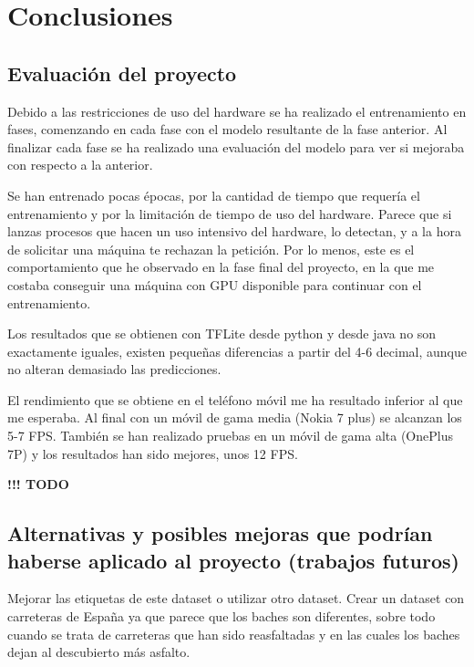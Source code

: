 \section{Conclusiones}
\label{sec:conclusiones}

\subsection{Evaluación del proyecto}


Debido a las restricciones de uso del hardware se ha realizado el entrenamiento en fases, comenzando en cada fase con el modelo resultante de la fase anterior. Al finalizar cada fase se ha realizado una evaluación del modelo para ver si mejoraba con respecto a la anterior.

Se han entrenado pocas épocas, por la cantidad de tiempo que requería el entrenamiento y por la limitación de tiempo de uso del hardware. Parece que si lanzas procesos que hacen un uso intensivo del hardware, lo detectan, y a la hora de solicitar una máquina te rechazan la petición. Por lo menos, este es el comportamiento que he observado en la fase final del proyecto, en la que me costaba conseguir una máquina con GPU disponible para continuar con el entrenamiento.

Los resultados que se obtienen con TFLite desde python y desde java no son exactamente iguales, existen pequeñas diferencias a partir del 4-6 decimal, aunque no alteran demasiado las predicciones.

El rendimiento que se obtiene en el teléfono móvil me ha resultado inferior al que me esperaba. Al final con un móvil de gama media (Nokia 7 plus) se alcanzan los 5-7 FPS. También se han realizado pruebas en un móvil de gama alta (OnePlus 7P) y los resultados han sido mejores, unos 12 FPS.

{\color{red} \textbf{!!! TODO}}

\subsection{Alternativas y posibles mejoras que podrían haberse aplicado al proyecto (trabajos futuros)}

Mejorar las etiquetas de este dataset o utilizar otro dataset. Crear un dataset con carreteras de España ya que parece que los baches son diferentes, sobre todo cuando se trata de carreteras que han sido reasfaltadas y en las cuales los baches dejan al descubierto más asfalto.


